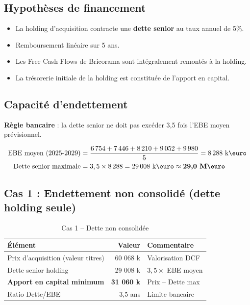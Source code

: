 \documentclass{rapportECL}
\begin{document}
\subsection{Hypothèses de financement}

\begin{itemize}
    \item La holding d'acquisition contracte une \textbf{dette senior} au taux annuel de 5\%.
    \item Remboursement linéaire sur 5 ans.
    \item Les Free Cash Flows de Bricorama sont intégralement remontés à la holding.
    \item La trésorerie initiale de la holding est constituée de l'apport en capital.
\end{itemize}

\subsection{Capacité d'endettement}

\textbf{Règle bancaire} : la dette senior ne doit pas excéder 3,5 fois l'EBE moyen prévisionnel.

\begin{align}
\text{EBE moyen (2025-2029)} &= \frac{6\,754 + 7\,446 + 8\,210 + 9\,052 + 9\,980}{5} = 8\,288 \text{ k\text{\euro}} \\
\text{Dette senior maximale} &= 3,5 \times 8\,288 = 29\,008 \text{ k\text{\euro}} \approx \textbf{29,0 M\text{\euro}}
\end{align}

\subsection{Cas 1 : Endettement non consolidé (dette holding seule)}

\begin{table}[H]
\centering
\caption{Cas 1 -- Dette non consolidée}
\begin{tabular}{l r l}
\toprule
\textbf{Élément} & \textbf{Valeur} & \textbf{Commentaire} \\
\midrule
Prix d'acquisition (valeur titres) & 60 068 k\text{\euro} & Valorisation DCF \\
Dette senior holding & 29 008 k\text{\euro} & $3,5 \times$ EBE moyen \\
\textbf{Apport en capital minimum} & \textbf{31 060 k\text{\euro}} & Prix -- Dette max \\
\midrule
Ratio Dette/EBE & 3,5 ans & Limite bancaire \\
\bottomrule
\end{tabular}
\end{table}
\end{document}
